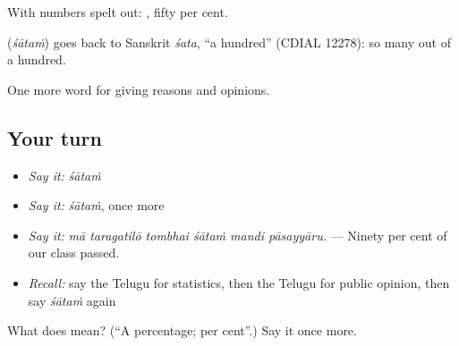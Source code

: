 With numbers spelt out:  , fifty per cent.

\begin{cousinweb}
\textbf{} (\emph{śātaṁ}) goes back to Sanskrit \emph{śata}, \textquotedblleft{}a hundred\textquotedblright{} (CDIAL 12278): so many out of a hundred.
\end{cousinweb}

\begin{grammarlens}[title={What you've built}]
One more word for giving reasons and opinions.
\end{grammarlens}

\subsection*{Your turn}
\begin{itemize}
\raggedright
  \item \emph{Say it:} \emph{śātaṁ}
  \item \emph{Say it:} \emph{śātaṁ}, once more
  \item \emph{Say it:} \emph{mā taragatilō tombhai śātaṁ mandi pāsayyāru.} — Ninety per cent of our class passed.
  \item \emph{Recall:} say the Telugu for statistics, then the Telugu for public opinion, then say \emph{śātaṁ} again
\end{itemize}

\begin{tcolorbox}[breakable,colback=teal!4,colframe=teal!35!black,title={Before you move on}]
What does  mean? (\textquotedblleft{}A percentage; per cent\textquotedblright{}.) Say it once more.
\end{tcolorbox}
